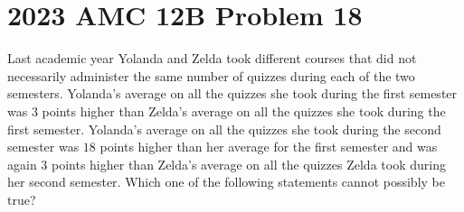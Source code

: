 \documentclass{article}
\begin{document}
\newpage
\section*{2023 AMC 12B Problem 18}
Last academic year Yolanda and Zelda took different
courses that did not necessarily administer the same
number of quizzes during each of the two semesters.
Yolanda's average on all the quizzes she took during
the first semester was $3$ points higher than Zelda's
average on all the quizzes she took during the first
semester. Yolanda's average on all the quizzes she took
during the second semester was $18$ points higher than
her average for the first semester and was again $3$
points higher than Zelda's average on all the quizzes
Zelda took during her second semester. Which one of the
following statements cannot possibly be true?
\end{document}
